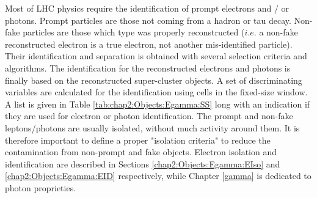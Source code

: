 Most of LHC physics require the identification of prompt electrons and / or photons. Prompt particles are those not coming from a hadron or tau decay. Non-fake particles are those which type was properly reconstructed ($i.e.$ a non-fake reconstructed electron is a true electron, not another mis-identified particle). Their identification and separation is obtained with several selection criteria and algorithms. The identification for the reconstructed electrons and photons is finally based on the reconstructed super-cluster objects. A set of discriminating variables are calculated for the identification using cells in the fixed-size window. A list is given in Table \ref{tab:chap2:Objects:Egamma:SS} long with an indication if they are used for electron or photon identification. The prompt and non-fake leptons/photons are usually isolated, without much activity around them. It is therefore important to define a proper "isolation criteria" to reduce the contamination from non-prompt and fake objects. Electron isolation and identification are described in Sections \ref{chap2:Objects:Egamma:EIso} and \ref{chap2:Objects:Egamma:EID} respectively, while Chapter \ref{gamma} is dedicated to photon proprieties.
